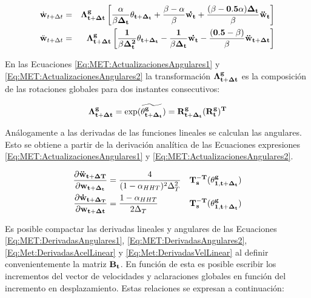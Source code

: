  \begin{eqnarray}\label{Eq:MET:ActualizacionesAngulares1}
 	\dot{\bf{w}}_{t+\Delta t}&=&\bf{\Lambda}_{t+\Delta
 		t}^g\left[\frac{\alpha}{\beta\Delta_t}\bf{\theta}_{t+\Delta_t}+
 	\frac{\beta-\alpha}{\beta}\bf{\dot{w_t}+\frac{(\beta-0.5\alpha)\Delta_t}{\beta}}
 	\ddot{\bf{w}}_{t} \right ]\\\label{Eq:MET:ActualizacionesAngulares2}
 	\ddot{\bf{w}}_{t+\Delta t}&=&\bf{\Lambda}_{t+\Delta
 		t}^g\left[\frac{1}{\beta\Delta_t^2}\bf{\theta}_{t+\Delta_t}-
 	\frac{1}{\beta\Delta_t}\bf{\dot{w_t}-\frac{(0.5-\beta)}{\beta}}
 	\ddot{\bf{w}}_{t+\Delta t} \right ]
 \end{eqnarray}

En las Ecuaciones \eqref{Eq:MET:ActualizacionesAngulares1} y \eqref{Eq:MET:ActualizacionesAngulares2} la transformación $\bf{\Lambda}_{t+\Delta t}^g$ es la composición de las rotaciones globales para dos instantes consecutivos: 

\begin{equation}\label{Eq:Met:CalculodeLamda}
	\bf{\Lambda}_{t+\Delta
		t}^g=\exp({\widetilde{\bf{\theta_{t+\Delta_t}^g}}})=\bf{R}^g_{t+\Delta_t}(\bf{R}^g_{t})^T
\end{equation}

Análogamente a las derivadas de las funciones lineales se calculan las angulares. Esto se obtiene a partir de la derivación analítica de las Ecuaciones expresiones \eqref{Eq:MET:ActualizacionesAngulares1} y \eqref{Eq:MET:ActualizacionesAngulares2}.

\begin{eqnarray}
	\label{Eq:MET:DerivadasAngulares1}
	\frac{\partial \bf{\ddot{w}_{t+\Delta T}}}{\partial \bf{{w}_{t+\Delta_t}}}& = 
	\frac{4}{(1-\alpha_{HHT})^2 \Delta_T^2}&  \bf{T_s^{-T}}(\bf{\theta^g_{1,{t+\Delta_t}}})\\
	\label{Eq:MET:DerivadasAngulares2}
	\frac{\partial \bf{\dot{w}_{t+\Delta_T}}}{\partial \bf{{w}_{t+\Delta t}}}& = 
	\frac{1-\alpha_{HHT}}{2\Delta_T}& \bf{T_s^{-T}}(\bf{\theta^g_{1,{t+\Delta_t}}})
\end{eqnarray}



Es posible compactar las derivadas lineales y angulares de las Ecuaciones \eqref{Eq:MET:DerivadasAngulares1}, \eqref{Eq:MET:DerivadasAngulares2}, \eqref{Eq:Met:DerivadasAcelLinear} y \eqref{Eq:Met:DerivadasVelLinear} al definir convenientemente la matriz $\bf{B_t}$. En función de esta es posible escribir los incrementos del vector de velocidades y aclaraciones globales en función del incremento en desplazamiento. Estas relaciones se expresan a continuación:
	 

